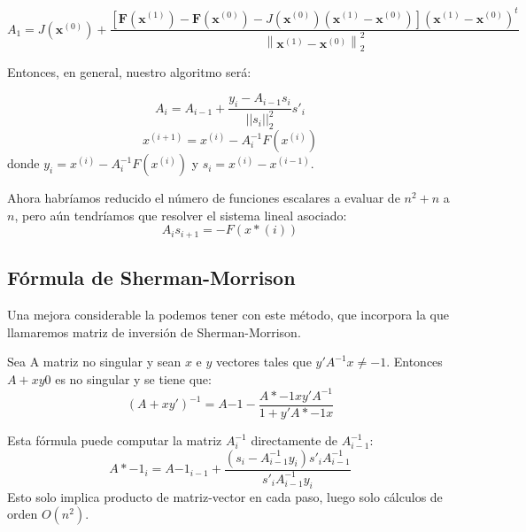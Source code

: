 \[A_{1}=J\left(\mathbf{x}^{(0)}\right)+\frac{\left[\mathbf{F}\left(\mathbf{x}^{(1)}\right)-\mathbf{F}\left(\mathbf{x}^{(0)}\right)-J\left(\mathbf{x}^{(0)}\right)\left(\mathbf{x}^{(1)}-\mathbf{x}^{(0)}\right)\right]\left(\mathbf{x}^{(1)}-\mathbf{x}^{(0)}\right)^{t}}{\left\|\mathbf{x}^{(1)}-\mathbf{x}^{(0)}\right\|_{2}^{2}}\]

Entonces, en general, nuestro algoritmo será:

\[A_i = A_{i-1} + \frac{y_i-A_{i-1} s_i}{||s_i||^2_2}s'_i\]
\[x^{(i+1)} = x^{(i)}-A_i^{-1} F(x^{(i)})\]
donde $y_i = x^(i)-A_i^{-1}F(x^{(i)})$ y $s_i = x^{(i)} - x^{(i-1)}$.

Ahora habríamos reducido el número de funciones escalares a evaluar de $n^2+n$ a $n$, pero aún tendríamos que resolver el sistema lineal asociado:
\[A_i s_{i+1} = -F(x*{(i)}) \]

\subsection{Fórmula de Sherman-Morrison}

Una mejora considerable la podemos tener con este método, que incorpora la que llamaremos matriz de inversión de Sherman-Morrison.

\begin{theorem}
	Sea A matriz no singular y sean $x$ e $y$ vectores tales que $y'A^{-1}x \neq -1$. Entonces $A + xy0$ es no singular y se tiene que:
	\[(A + xy')^{-1} = A{-1} - \frac{A*{-1}xy'A^{-1}}{1+y'A*{-1}x}\]
\end{theorem}

Esta fórmula puede computar la matriz $A^{-1}_i$ directamente de $A^{-1}_{i-1}$:
\[A*{-1}_i = A{-1}_{i-1} + \frac{(s_i-A^{-1}_{i-1}y_i)s'_iA^{-1}_{i-1}}{s'_iA^{-1}_{i-1}y_i}\]
Esto solo implica producto de matriz-vector en cada paso, luego solo cálculos de orden $O(n^2)$.


